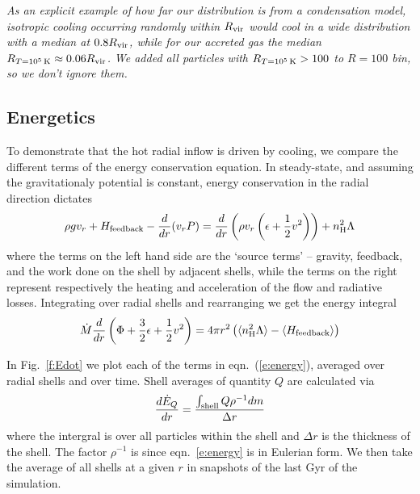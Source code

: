 \documentclass[fleqn,usenatbib]{mnras}
\newcommand{\Rcool}{R_{T=10^5\,{\rm K}}}
\newcommand{\Mdot}{\dot{M}}
\begin{document}
\textit{
As an explicit example of how far our distribution is from a condensation model, isotropic cooling occurring randomly within $R_{\rm vir}$ would cool in a wide distribution with a median at $0.8 R_{\rm vir}$, while for our accreted gas the median $\Rcool \approx 0.06 R_{\rm vir}$.
}
\textit{We added all particles with $\Rcool>100$ to $R=100$ bin, so we don't ignore them.}

\subsection{Energetics}

To demonstrate that the hot radial inflow is driven by cooling, we compare the different terms of the energy conservation equation. In steady-state, and assuming the gravitationaly potential is constant,  energy conservation in the radial direction dictates \citep[e.g.][]{Shu82}
\begin{equation}\label{e:energy}
    \rho g v_r + H_{\rm feedback} - \frac{d}{dr}(v_r P)= 
    \frac{d}{dr}\left(\rho v_r \left(\epsilon+\frac{1}{2}v^2\right)\right)  +  n_{\rm H}^2\Lambda  
\end{equation}
where the terms on the left hand side are the `source terms' -- gravity, feedback, and the work done on the shell by adjacent shells, while the terms on the right represent respectively the heating and acceleration of the flow and radiative losses. 
Integrating over radial shells and rearranging we get the energy integral
\begin{equation}
    \Mdot\frac{d}{dr}\left(\Phi+\frac{3}{2}\epsilon + \frac{1}{2}v^2\right) = 4\pi r^2 \left(\langle\nH^2\Lambda\rangle-\langle H_{\rm feedback}\rangle\right)
\end{equation}

In Fig.~\ref{f:Edot} we plot each of the terms in eqn.~(\ref{e:energy}), averaged over radial shells and over time. Shell averages of quantity $Q$ are calculated via 
\begin{equation}
    \frac{d\dot{E}_Q}{d r} = \frac{\int_{\rm shell} Q\rho^{-1} dm}{\Delta r} 
\end{equation}
where the intergral is over all particles within the shell and $\Delta r$ is the thickness of the shell. The factor $\rho^{-1}$ is since eqn.~\ref{e:energy} is in Eulerian form. We then take the average of all shells at a given $r$ in snapshots of the last Gyr of the simulation. 
\end{document}
